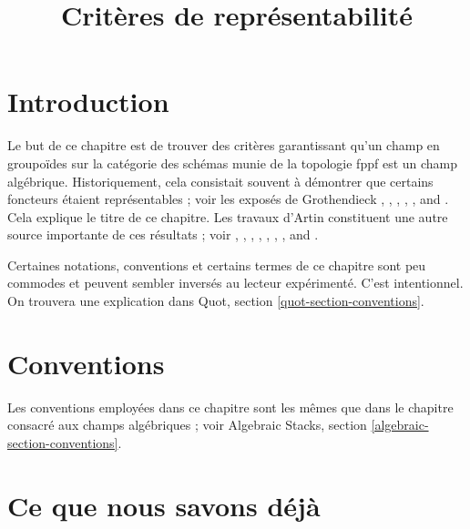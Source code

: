 

%


\title{Critères de représentabilité}

\maketitle

\label{section-phantom}

\tableofcontents




\section{Introduction}
\label{section-introduction}

\noindent
Le but de ce chapitre est de trouver des critères garantissant qu'un
champ en groupoïdes sur la catégorie des schémas munie de la topologie fppf
est un champ algébrique. Historiquement, cela consistait souvent à démontrer que
certains foncteurs étaient représentables ; voir les exposés de Grothendieck
\cite{Gr-I},
\cite{Gr-II},
\cite{Gr-III},
\cite{Gr-IV},
\cite{Gr-V}, and
\cite{Gr-VI}.
Cela explique le titre de ce chapitre. Les travaux d'Artin constituent une autre
source importante de ces résultats ; voir
\cite{ArtinI},
\cite{ArtinII},
\cite{Artin-Theorem-Representability},
\cite{Artin-Construction-Techniques},
\cite{Artin-Algebraic-Spaces},
\cite{Artin-Algebraic-Approximation},
\cite{Artin-Implicit-Function}, and
\cite{ArtinVersal}.

\medskip\noindent
Certaines notations, conventions et certains termes de ce chapitre sont peu
commodes et peuvent sembler inversés au lecteur expérimenté. C'est intentionnel.
On trouvera une explication dans Quot, section
\ref{quot-section-conventions}.



\section{Conventions}
\label{section-conventions}

\noindent
Les conventions employées dans ce chapitre sont les mêmes que dans le
chapitre consacré aux champs algébriques ; voir
Algebraic Stacks, section \ref{algebraic-section-conventions}.




\section{Ce que nous savons déjà}
\label{section-done-so-far}

